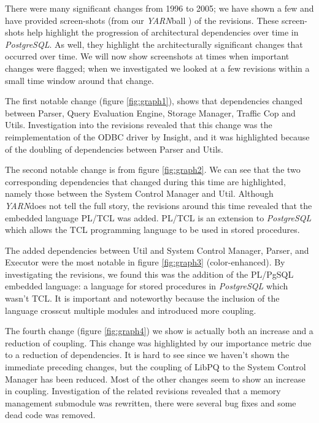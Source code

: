 \documentclass[times, 10pt,twocolumn]{article}
\newcommand{\yarn}{\emph{YARN\xspace}}
\newcommand{\YARN}{\yarn}
\newcommand{\postgresql}{\emph{PostgreSQL}\xspace}
\newcommand{\shtn}{\vspace*{-.5em}}
\begin{document}
\shtn
{}
\shtn {} There were many significant changes from 1996 to
2005; we have shown a few and have provided screen-shots (from our
\YARN ball \cite{yarnball}) of the revisions.  These screen-shots help
highlight the progression of architectural dependencies over time in
\postgresql. As well, they highlight the architecturally significant
changes that occurred over time. We will now show screenshots at times
when important changes were flagged; when we investigated we looked at
a few revisions within a small time window around that change.

The first notable change (figure \ref{fig:graph1}), shows that
dependencies changed between Parser, Query Evaluation Engine,
Storage Manager, Traffic Cop and Utils.  Investigation into the
revisions revealed that this change was the reimplementation of the
ODBC driver by Insight, and it was highlighted because of the doubling of
dependencies between Parser and Utils.


The second notable change is from figure \ref{fig:graph2}.  We can see
that the two corresponding dependencies that changed during this time
are highlighted, namely those between the System Control Manager
and Util. Although \yarn does not tell the full story,
the revisions around this time revealed that
the embedded language PL/TCL was added.  PL/TCL is an extension to
\postgresql which allows the TCL programming language to be used in
stored procedures.


The added dependencies between Util and System Control Manager,
Parser, and Executor were the most notable in figure \ref{fig:graph3}
(color-enhanced).  By investigating the revisions, we found this was
the addition of the PL/PgSQL embedded language: a language for stored
procedures in \postgresql which wasn't TCL.  It is important and
noteworthy because the inclusion of the language crosscut multiple
modules and introduced more coupling.

The fourth change (figure \ref{fig:graph4}) we show is actually both
an increase and a reduction of coupling.  This change was highlighted
by our importance metric due to a reduction of dependencies.  It is
hard to see since we haven't shown the immediate preceding changes,
but the coupling of LibPQ to the System Control Manager has been
reduced. Most of the other changes seem to show an increase in
coupling. Investigation of the related revisions revealed that a
memory management submodule was rewritten, there were several bug
fixes and some dead code was removed.
\end{document}
